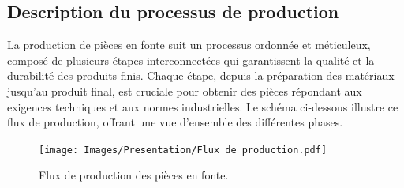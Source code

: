 \documentclass[12pt]{article}
\begin{document}
\newpage

\subsection{Description du processus de production}

La production de pièces en fonte suit un processus ordonnée et méticuleux, 
composé de plusieurs étapes interconnectées qui garantissent la qualité 
et la durabilité des produits finis. Chaque étape, depuis la préparation 
des matériaux jusqu'au produit final, est cruciale pour obtenir des pièces 
répondant aux exigences techniques et aux normes industrielles. 
Le schéma ci-dessous illustre ce flux de production, offrant une vue 
d'ensemble des différentes phases. 

\begin{figure}[H]
    \centering
    \begin{adjustbox}{width=1.3\textwidth,height=0.8\textheight,center}
        \texttt{[image: Images/Presentation/Flux de production.pdf]}
    \end{adjustbox}
    \caption{Flux de production des pièces en fonte.}
    \label{fig:flux-production}
\end{figure}
\end{document}
